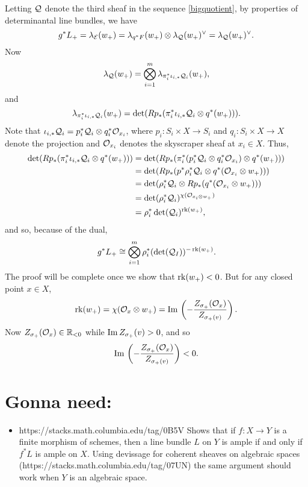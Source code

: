 \documentclass[letterpaper,12pt]{amsart}
\theoremstyle{remark}
\begin{document}
Letting $\mathcal{Q}$ denote the third sheaf in the sequence \eqref{bigquotient}, by properties of determinantal line bundles, we have
\[ g^*L_+ = \lambda_{\mathcal{E}}(w_+) = \lambda_{q^*F}(w_+) \otimes \lambda_{\mathcal{Q}}(w_+)^\vee = \lambda_{\mathcal{Q}}(w_+)^\vee. \]
Now
\[ \lambda_{\mathcal{Q}}(w_+) = \bigotimes_{i=1}^m \lambda_{\pi_i^* \iota_{i,*}\mathcal{Q}_i}(w_+), \]
and
\[ \lambda_{\pi_i^* \iota_{i,*}\mathcal{Q}_i}(w_+) = \det(R p_*(\pi_i^* \iota_{i,*}\mathcal{Q}_i \otimes q^*(w_+))). \]
Note that $\iota_{i,*}\mathcal{Q}_i = p_i^* \mathcal{Q}_i \otimes q_i^*\mathcal{O}_{x_i}$, where $p_i: S_i \times X \to S_i$ and $q_i: S_i \times X \to X$ denote the projection and $\mathcal{O}_{x_i}$ denotes the skyscraper sheaf at $x_i \in X$. Thus, 
\begin{align*}
    \det(R p_*(\pi_i^* \iota_{i,*}\mathcal{Q}_i \otimes q^*(w_+))) & = \det(R p_*(\pi_i^*(p_i^*\mathcal{Q}_i \otimes q_i^* \mathcal{O}_{x_i}) \otimes q^*(w_+))) \\
    & = \det(R p_*(p^* \rho_i^*\mathcal{Q}_i \otimes q^*(\mathcal{O}_{x_i} \otimes w_+))) \\
    & = \det(\rho_i^*\mathcal{Q}_i \otimes R p_*(q^*(\mathcal{O}_{x_i} \otimes w_+))) \\
    & = \det(\rho_i^*\mathcal{Q}_i)^{\chi(\mathcal{O}_{x_i \otimes w_+})} \\
    & = \rho_i^* \det(\mathcal{Q}_i)^{\operatorname{\mathrm{rk}}(w_+)},
\end{align*}
and so, because of the dual,
\[ g^*L_+ \cong \bigotimes_{i=1}^m \rho_i^*(\det(\mathcal{Q}_I))^{-\operatorname{\mathrm{rk}}(w_+)}. \]
The proof will be complete once we show that $\operatorname{\mathrm{rk}}(w_+) < 0$. But for any closed point $x \in X$,
\[ \operatorname{\mathrm{rk}}(w_+) = \chi(\mathcal{O}_x \otimes w_+) = \mathrm{Im}\,\left(-\frac{Z_{\sigma_+}(\mathcal{O}_x)}{Z_{\sigma_+(v)}}\right). \]
Now $Z_{\sigma_+}(\mathcal{O}_x) \in \mathbb{R}_{<0}$ while $\mathrm{Im}\, Z_{\sigma_+}(v) > 0$, and so
\[ \mathrm{Im}\,\left(-\frac{Z_{\sigma_+}(\mathcal{O}_x)}{Z_{\sigma_+(v)}}\right) < 0. \]


\section{Gonna need:}
\begin{itemize}
    \item https://stacks.math.columbia.edu/tag/0B5V Shows that if $f: X \to Y$ is a finite morphism of schemes, then a line bundle $L$ on $Y$ is ample if and only if $f^* L$ is ample on $X$. Using devissage for coherent sheaves on algebraic spaces (https://stacks.math.columbia.edu/tag/07UN) the same argument should work when $Y$ is an algebraic space.
\end{itemize}




\end{document}
